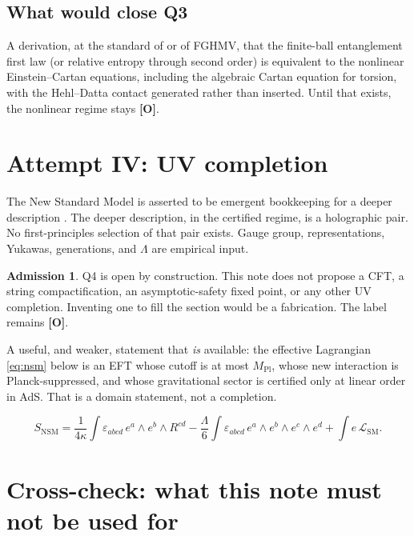 \documentclass[11pt]{article}
\theoremstyle{definition}
\newtheorem*{admission}{Admission}
\newcommand{\pO}{\textbf{[O]}}
\begin{document}
\subsection{What would close Q3}

A derivation, at the standard of \cite{FHHPRV2017} or of FGHMV, that
the finite-ball entanglement first law (or relative entropy through
second order) is equivalent to the nonlinear Einstein--Cartan
equations, including the algebraic Cartan equation for torsion, with
the Hehl--Datta contact generated rather than inserted. Until that
exists, the nonlinear regime stays \pO{}.

\section{Attempt IV: UV completion}
\label{sec:uv}

The New Standard Model is asserted to be emergent bookkeeping for a
deeper description \cite{McGwierIII}. The deeper description, in the
certified regime, is a holographic pair. No first-principles
selection of that pair exists. Gauge group, representations,
Yukawas, generations, and $\Lambda$ are empirical input.

\begin{admission}
Q4 is open by construction. This note does not propose a CFT, a
string compactification, an asymptotic-safety fixed point, or any
other UV completion. Inventing one to fill the section would be a
fabrication. The label remains \pO{}.
\end{admission}

A useful, and weaker, statement that \emph{is} available: the
effective Lagrangian \eqref{eq:nsm} below is an EFT whose cutoff is
at most $M_{\mathrm{Pl}}$, whose new interaction is Planck-suppressed,
and whose gravitational sector is certified only at linear order in
AdS. That is a domain statement, not a completion.

\begin{equation}
S_{\mathrm{NSM}}
=
\frac{1}{4\kappa}
\int\varepsilon_{abcd}\,e^a\wedge e^b\wedge R^{cd}
-
\frac{\Lambda}{6}
\int\varepsilon_{abcd}\,e^a\wedge e^b\wedge e^c\wedge e^d
+
\int e\,\mathcal{L}_{\mathrm{SM}}.
\label{eq:nsm}
\end{equation}

\section{Cross-check: what this note must not be used for}
\end{document}
